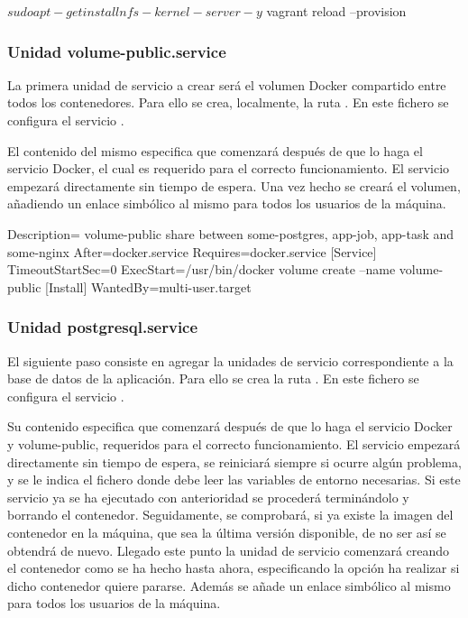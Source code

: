 \begin{code}
$ sudo apt-get install nfs-kernel-server -y
$ vagrant reload --provision
\end{code}

\subsubsection{Unidad volume-public.service}

La primera unidad de servicio a crear será el volumen Docker compartido entre todos los contenedores. Para ello se crea, localmente, la ruta . En este fichero se configura el servicio . 

El contenido del mismo especifica que comenzará después de que lo haga el servicio Docker, el cual es requerido para el correcto funcionamiento. El servicio empezará directamente sin tiempo de espera. Una vez hecho se creará el volumen, añadiendo un enlace simbólico al mismo para todos los usuarios de la máquina. 

\begin{codelisting}
\label{code:volume-public.service}
\begin{code}
[Unit] 
  Description= volume-public share between some-postgres, app-job, app-task and 
               some-nginx 
  After=docker.service
  Requires=docker.service
[Service] 
  TimeoutStartSec=0 
  ExecStart=/usr/bin/docker volume create --name volume-public
[Install] 
  WantedBy=multi-user.target
\end{code}
\end{codelisting}

\subsubsection{Unidad postgresql.service}

El siguiente paso consiste en agregar la unidades de servicio correspondiente a la base de datos de la aplicación. Para ello  se crea la ruta . En este fichero se configura el servicio .

Su contenido especifica que comenzará después de que lo haga el servicio Docker y volume-public, requeridos para el correcto funcionamiento. El servicio empezará directamente sin tiempo de espera, se reiniciará siempre si ocurre algún problema, y se le indica el fichero donde debe leer las variables de entorno necesarias. Si este servicio ya se ha ejecutado con anterioridad se procederá terminándolo y borrando el contenedor. Seguidamente, se comprobará, si ya existe la imagen del contenedor en la máquina, que sea la última versión disponible, de no ser así se obtendrá de nuevo. Llegado este punto la unidad de servicio comenzará creando el contenedor como se ha hecho hasta ahora, especificando la opción ha realizar si dicho contenedor quiere pararse. Además se añade un enlace simbólico al mismo para todos los usuarios de la máquina. 

